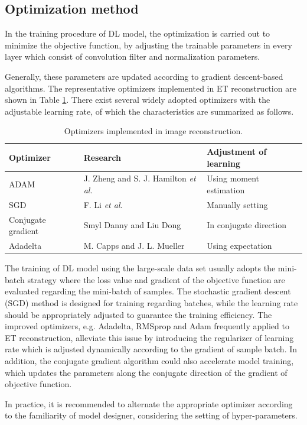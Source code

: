 \subsection{Optimization method}
\label{subsec:Optimization method}

In the training procedure of DL model, the optimization is carried out to minimize the objective function, by adjusting the trainable parameters in every layer which consist of convolution filter and normalization parameters.

Generally, these parameters are updated according to gradient descent-based algorithms. The representative optimizers implemented in ET reconstruction are shown in Table \ref{tab:optimizer}. There exist several widely adopted optimizers with the adjustable learning rate, of which the characteristics are summarized as follows.

\begin{table}
\caption{Optimizers implemented in image reconstruction.}\label{tab:optimizer}
  \centering
  \footnotesize{
  \begin{tabular}{p{2.5cm}p{2cm}p{3cm}}
  \hline
   Optimizer & Research & Adjustment of learning\\
  \hline
   ADAM& J. Zheng and S. J. Hamilton \emph{et al.}\cite{Zheng2020ADeep,Hamilton2018Deep}& Using moment estimation\\
   SGD& F. Li \emph{et al.} \cite{Li2021Electrical}& Manually setting \\
   Conjugate gradient& Smyl Danny and Liu Dong\cite{Smyl2020Optimizing}&In conjugate direction\\
   Adadelta& M. Capps and J. L. Mueller\cite{Capps2021Reconstruction}&Using expectation\\
  \hline
  \end{tabular}}
\end{table}


The training of DL model using the large-scale data set usually adopts the mini-batch strategy where the loss value and gradient of the objective function are evaluated regarding the mini-batch of samples.
The stochastic gradient descent (SGD) method is designed for training regarding batches, while the learning rate should be appropriately adjusted to guarantee the training efficiency.
The improved optimizers, e.g. Adadelta, RMSprop and Adam frequently applied to ET reconstruction, alleviate this issue by introducing the regularizer of learning rate which is adjusted dynamically according to the gradient of sample batch.
In addition, the conjugate gradient algorithm could also accelerate model training, which updates the parameters along the conjugate direction of the gradient of objective function.

In practice, it is recommended to alternate the appropriate optimizer according to the familiarity of model designer, considering the setting of hyper-parameters.


